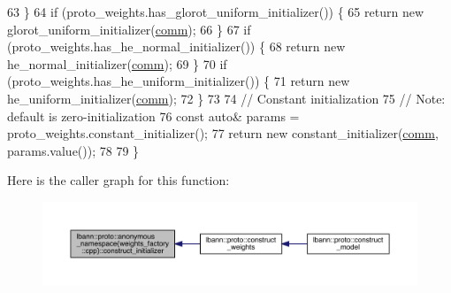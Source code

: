\begin{DoxyCode}
63   \}
64   \textcolor{keywordflow}{if} (proto\_weights.has\_glorot\_uniform\_initializer()) \{
65     \textcolor{keywordflow}{return} \textcolor{keyword}{new} glorot\_uniform\_initializer(\hyperlink{file__io_8cpp_ab048c6f9fcbcfaa57ce68b00263dbebe}{comm});
66   \}
67   \textcolor{keywordflow}{if} (proto\_weights.has\_he\_normal\_initializer()) \{
68     \textcolor{keywordflow}{return} \textcolor{keyword}{new} he\_normal\_initializer(\hyperlink{file__io_8cpp_ab048c6f9fcbcfaa57ce68b00263dbebe}{comm});
69   \}
70   \textcolor{keywordflow}{if} (proto\_weights.has\_he\_uniform\_initializer()) \{
71     \textcolor{keywordflow}{return} \textcolor{keyword}{new} he\_uniform\_initializer(\hyperlink{file__io_8cpp_ab048c6f9fcbcfaa57ce68b00263dbebe}{comm});
72   \}
73 
74   \textcolor{comment}{// Constant initialization}
75   \textcolor{comment}{// Note: default is zero-initialization}
76   \textcolor{keyword}{const} \textcolor{keyword}{auto}& params = proto\_weights.constant\_initializer();
77   \textcolor{keywordflow}{return} \textcolor{keyword}{new} constant\_initializer(\hyperlink{file__io_8cpp_ab048c6f9fcbcfaa57ce68b00263dbebe}{comm}, params.value());
78 
79 \}
\end{DoxyCode}
Here is the caller graph for this function\+:\nopagebreak
\begin{figure}[H]
\begin{center}
\leavevmode
\includegraphics[width=350pt]{namespacelbann_1_1proto_1_1anonymous__namespace_02weights__factory_8cpp_03_a2bbaafd93915c6f2334e16f0afcd4ee5_icgraph}
\end{center}
\end{figure}
